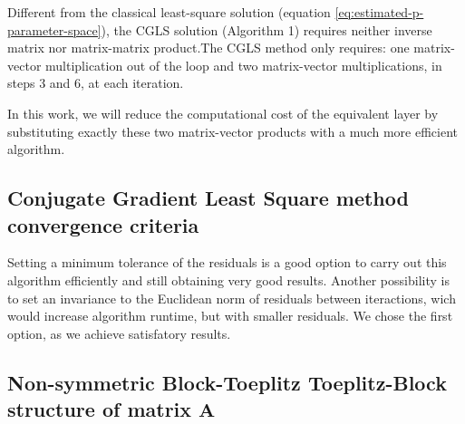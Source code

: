 Different from the classical least-square solution (equation \ref{eq:estimated-p-parameter-space}), the CGLS solution (Algorithm 1) requires neither inverse matrix nor matrix-matrix product.The CGLS method only requires: one matrix-vector multiplication out of the loop and two matrix-vector multiplications, in steps 3 and 6, at each iteration. 

In this work, we will reduce the computational cost of the equivalent layer by substituting exactly these two matrix-vector products with a much more efficient algorithm.

\subsection{Conjugate Gradient Least Square method convergence criteria}

Setting a minimum tolerance of the residuals is a good option to carry out this algorithm efficiently and still obtaining very good results. 
Another possibility is to set an invariance to the Euclidean norm of residuals between iteractions, wich would increase algorithm runtime, but with smaller residuals. 
We chose the first option, as we achieve satisfatory results.

\subsection{Non-symmetric Block-Toeplitz Toeplitz-Block structure of matrix $\mathbf{A}$}

